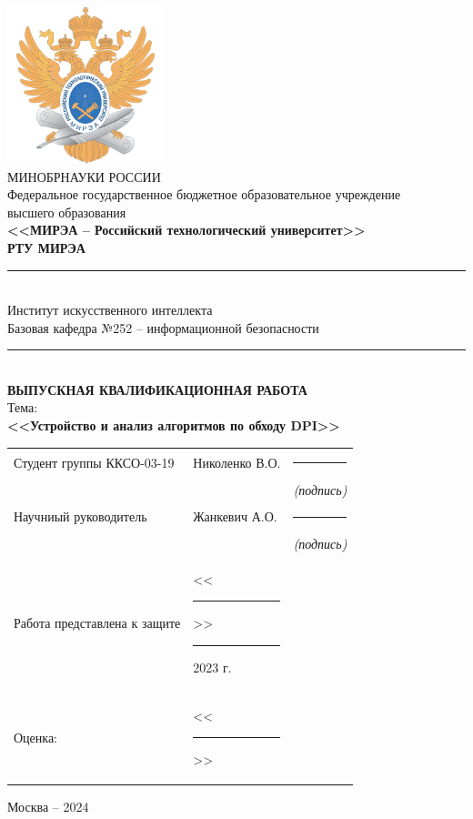 \documentclass[utf8,14pt,a4paper,oneside,russian]{book}
\begin{document}
\thispagestyle{empty}
\small
\begin{center}
    \includegraphics[width=4.55cm]{logo_mirea}\\
    \MakeUppercase{Минобрнауки России}\\[1em]
    Федеральное государственное бюджетное образовательное учреждение\\
    высшего образования\\[0.5em]
    \textbf{<<МИРЭА -- Российский технологический университет>>}\\
    \textbf{РТУ МИРЭА}\\
    \rule{\textwidth}{0.75pt}\\
    Институт искусственного интеллекта\\
    Базовая кафедра №252 -- информационной безопасности\\[-0.45em]
    \rule{\textwidth}{0.75pt}\\[5em]
    \normalsize\MakeUppercase{\textbf{Выпускная Квалификационная Работа}}\small\\[0.5em]
    Тема:\\ \textbf{<<Устройство и анализ алгоритмов по обходу DPI>>} \\[3em]
    \begin{tabular}{p{7cm}p{6cm}c}
        Студент группы ККСО-03-19    & Николенко В.О.                                      & \rule{2cm}{0.75pt}                    \\[-0.5em]
                                     &                                                     & \footnotesize\textit{(подпись)}\small \\[1em]
        Научниый руководитель        & Жанкевич А.О.                                       & \rule{2cm}{0.75pt}                    \\[-0.5em]
                                     &                                                     & \footnotesize\textit{(подпись)}\small \\[5em]
        Работа представлена к защите & <<\rule{0.5cm}{0.75pt}>> \rule{2cm}{0.75pt} 2023 г. &                                       \\[1em]
        Оценка:                      & <<\rule{0.5cm}{0.75pt}>>                            &                                       \\[1em]
    \end{tabular}
    \vfill
    Москва -- 2024
\end{center}
\normalsize
\newpage
\end{document}
